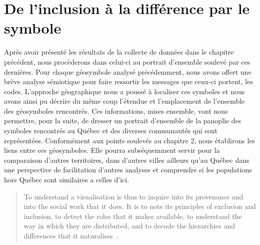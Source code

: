 \chapter{De l'inclusion à la différence par le symbole}
\label{cha:de_l_inclusion_la_diff_rence_par_le_symbole}

Après avoir présenté les résultats de la collecte de données dans le chapitre précédent, nous procèderons dans celui-ci au portrait d'ensemble soulevé par ces dernières.
Pour chaque géosymbole analysé précédemment, nous avons offert une brève analyse sémiotique pour faire ressortir les messages que ceux-ci portent, les codes.
L'approche géographique nous a poussé à localiser ces symboles et nous avons ainsi pu décrire du même coup l'étendue et l'emplacement de l'ensemble
des géosymboles rencontrés.
Ces informations, mises ensemble, vont nous permettre, pour la suite, de dresser un portrait d'ensemble de la panoplie des symboles rencontrés au Québec et des diverses communautés qui sont représentées.
Conformément aux points soulevés au chapitre 2, nous établirons les liens entre ces géosymboles.
Elle pourra subséquemment servir pour la comparaison d'autres territoires, dans d'autres villes ailleurs qu'au Québec dans une perspective de facilitation d'autres analyses et comprendre si les populations \lgbt{} hors Québec sont similaires a celles d'ici.

\begin{quote}
  To understand a visualisation is thus to inquire into its provenance and into the social work that it does.
  It is to note its principles of exclusion and inclusion, to detect the roles that it makes available, to understand the way in which they are distributed, and to decode the hierarchies and differences that it naturalises~\citep[1]{Fyfe1988}.
\end{quote}

